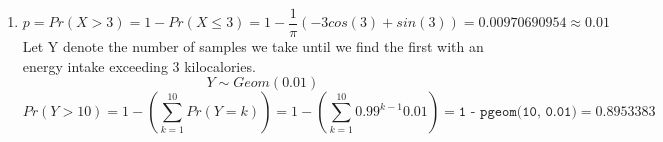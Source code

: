 \documentclass[11pt]{article}
\begin{document}
\begin{enumerate}[label=\textbf{Question \arabic*:},start=1]
\begin{enumerate}
  \item 
\[
p = Pr(X > 3) = 1 - Pr(X \leq 3) = 1 - \frac{1}{\pi}(-3 cos(3) + sin(3)) = 0.00970690954 \approx 0.01
\]
Let Y denote the number of samples we take until we find the first with an energy intake exceeding 3 kilocalories. \\
\[
Y \sim Geom(0.01)
\]
\[
Pr(Y > 10) = 1 - (\sum_{k=1}^{10} Pr(Y = k) ) = 1 - (\sum_{k=1}^{10} 0.99^{k-1} 0.01) = \texttt{1 - pgeom(10, 0.01)} = 0.8953383
\]



\end{enumerate}

\end{enumerate}
\end{document}
